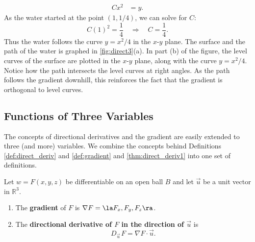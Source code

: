 {\begin{align*}
Cx^2 &= y.
\end{align*}
As the water started at the point $(1,1/4)$, we can solve for $C$:
$$C(1)^2 = \frac14 \quad \Rightarrow \quad C = \frac14.$$
Thus the water follows the curve $y=x^2/4$ in the $x$-$y$ plane. The surface and the path of the water is graphed in \autoref{fig:direct3}(a). In part (b) of the figure, the level curves of the surface are plotted in the $x$-$y$ plane, along with the curve $y=x^2/4$. Notice how the path intersects the level curves at right angles. As the path follows the gradient downhill, this reinforces the fact that the gradient is orthogonal to level curves.}

\subsection*{Functions of Three Variables}

The concepts of directional derivatives and the gradient are easily extended to three (and more) variables. We combine the concepts behind Definitions \ref{def:direct_deriv} and \ref{def:gradient} and \autoref{thm:direct_deriv1} into one set of definitions.

{Let $w=F(x,y,z)$ be differentiable on an open ball $B$ and let $\vec u $ be a unit vector in $\mathbb{R}^3$.
\begin{enumerate}
	\item	The \textbf{gradient} of $F$ is $\nabla F = \la F_x,F_y,F_z\ra$.
	\item The \textbf{directional derivative of $F$ in the direction of $\vec u$} is $$D_{\vec u\,}F=\nabla F\cdot \vec u.$$
\end{enumerate}
}

